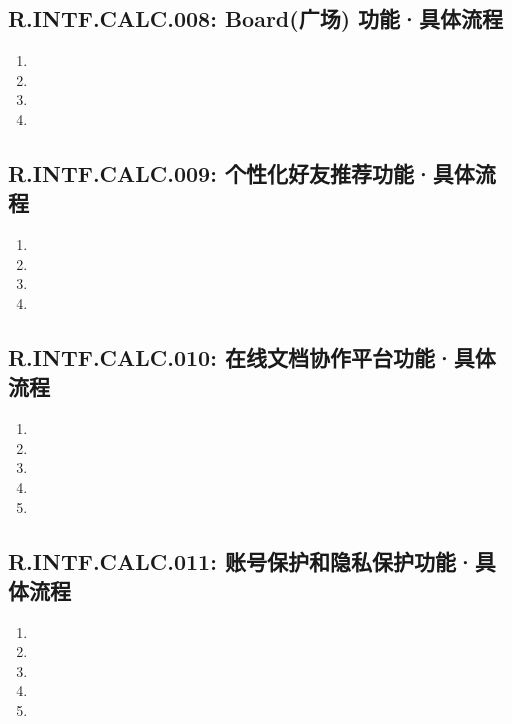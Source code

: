     \subsection{R.INTF.CALC.008: Board(广场) 功能·具体流程}
    \begin{enumerate}
        \item 
        \item 
        \item 
        \item 
    \end{enumerate}
    \subsection{R.INTF.CALC.009: 个性化好友推荐功能·具体流程}
    \begin{enumerate}
        \item 
        \item 
        \item 
        \item 
    \end{enumerate}
    \subsection{R.INTF.CALC.010: 在线文档协作平台功能·具体流程}
    \begin{enumerate}
        \item 
        \item 
        \item 
        \item 
        \item 
    \end{enumerate}
    \subsection{R.INTF.CALC.011: 账号保护和隐私保护功能·具体流程}
    \begin{enumerate}
        \item 
        \item 
        \item 
        \item 
        \item 
    \end{enumerate}
